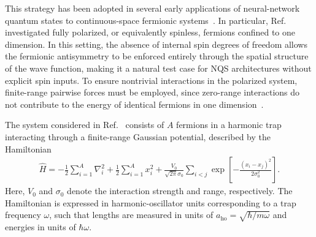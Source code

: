 
This strategy has been adopted in several early applications of neural-network quantum states to continuous-space fermionic systems~\cite{keeble_machine_2023,bedaque_machine_2024}. 
In particular, Ref.~\cite{keeble_machine_2023} investigated fully polarized, or equivalently spinless, fermions confined to one dimension. 
In this setting, the absence of internal spin degrees of freedom allows the fermionic antisymmetry to be enforced entirely through the spatial structure of the wave function, making it a natural test case for NQS architectures without explicit spin inputs. 
To ensure nontrivial interactions in the polarized system, finite-range pairwise forces must be employed, since zero-range interactions do not contribute to the energy of identical fermions in one dimension~\cite{keeble_machine_2023}.

The system considered in Ref.~\cite{keeble_machine_2023} consists of $A$ fermions in a harmonic trap interacting through a finite-range Gaussian potential, described by the Hamiltonian
\begin{align}
\hat H = - \frac{1}{2} \sum_{i=1}^A \nabla_i^2 
+ \frac{1}{2} \sum_{i=1}^A x_i^2
+ \frac{V_0}{\sqrt{2\pi}\sigma_0}
\sum_{i<j} \exp\!\left[-\frac{(x_i-x_j)^2}{2\sigma_0^2}\right].
\end{align}
Here, $V_0$ and $\sigma_0$ denote the interaction strength and range, respectively. 
The Hamiltonian is expressed in harmonic-oscillator units corresponding to a trap frequency $\omega$, such that lengths are measured in units of $a_{\mathrm{ho}} = \sqrt{\hbar/m\omega}$ and energies in units of $\hbar\omega$.

